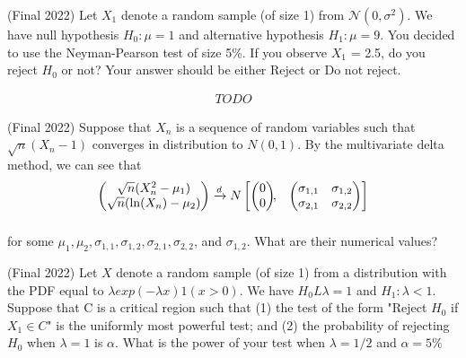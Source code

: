 \documentclass[answers]{exam}
\begin{document}
\begin{questions}
\begin{solution}
\end{solution}

\question (Final 2022) Let $X_1$ denote a random sample (of size 1) from $\mathcal{N}(0, \sigma^2)$. We have null hypothesis $H_0: \mu = 1$ and alternative hypothesis $H_1: \mu = 9$. You decided to use the Neyman-Pearson test of size 5\%. If you observe $X_1$ = 2.5, do you reject $H_0$ or
not? Your answer should be either Reject or Do not reject.
\begin{solution} 
    \begin{align*}
        TODO
    \end{align*}
\end{solution}

\question (Final 2022) Suppose that $X_n$ is a sequence of random variables such that $\sqrt{n}(X_n-1)$ converges in distribution to $N(0,1)$. By the multivariate delta method, we can see that
\begin{align*}
    \begin{pmatrix}
    \sqrt{n}(X_n^2-\mu_1)\\
    \sqrt{n}(\ln(X_n) - \mu_2)\\
    \end{pmatrix} 
    &\xrightarrow{d}  N
    \begin{bmatrix}
    \begin{pmatrix}
    0\\
    0
    \end{pmatrix}\!\!,&
    \begin{pmatrix}
    \sigma_{1,1} & \sigma_{1,2}\\
    \sigma_{2,1} & \sigma_{2,2}
    \end{pmatrix}
    \end{bmatrix}\\[2\jot]
    \end{align*}

for some $\mu_1, \mu_2, \sigma_{1,1}, \sigma_{1,2}, \sigma_{2,1}, \sigma_{2,2}$, and $\sigma_{1,2}$. What are their numerical values?
\begin{solution}
\end{solution}

\question (Final 2022) Let $X$ denote a random sample (of size 1) from a distribution with the PDF equal to $\lambda exp(-\lambda x) 1(x>0)$. We have $H_0 L \lambda = 1$ and $H_1 : \lambda < 1$. Suppose that C is a critical region such that (1) the test of the form "Reject $H_0$ if $X_1 \in C$" is the uniformly most powerful test; and (2) the probability of rejecting $H_0$ when $\lambda = 1$ is $\alpha$. What is the power of your test when $\lambda = 1/2$ and $\alpha = 5\%$
\begin{solution}
\end{solution}


\end{questions}
\end{document}
